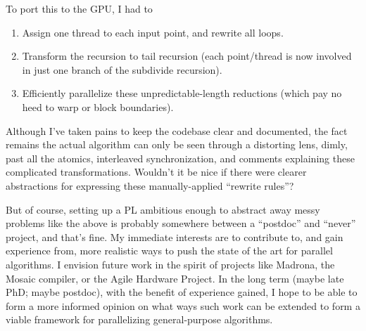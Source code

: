 To port this to the GPU, I had to
\begin{enumerate}
  \item Assign one thread to each input point, and rewrite all loops.

  \item Transform the recursion to tail recursion (each point/thread
  is now involved in just one branch of the subdivide recursion).

  \item Efficiently parallelize these unpredictable-length reductions (which pay
  no heed to warp or block boundaries).
\end{enumerate}

Although I've taken pains to keep the codebase clear and documented,
the fact remains the actual algorithm can only be seen through a
distorting lens, dimly, past all the atomics, interleaved
synchronization, and comments explaining these complicated
transformations.  Wouldn't it be nice if there were clearer
abstractions for expressing these manually-applied ``rewrite rules''?

But of course, setting up a PL ambitious enough to abstract away messy
problems like the above is probably somewhere between a ``postdoc''
and ``never'' project, and that's fine. My immediate interests are to
contribute to, and gain experience from, more realistic ways to push
the state of the art for parallel algorithms. I envision future work
in the spirit of projects like Madrona, the Mosaic compiler, or the
Agile Hardware Project. In the long term (maybe late PhD; maybe
postdoc), with the benefit of experience gained, I hope to be able to
form a more informed opinion on what ways such work can be extended to
form a viable framework for parallelizing general-purpose algorithms.



